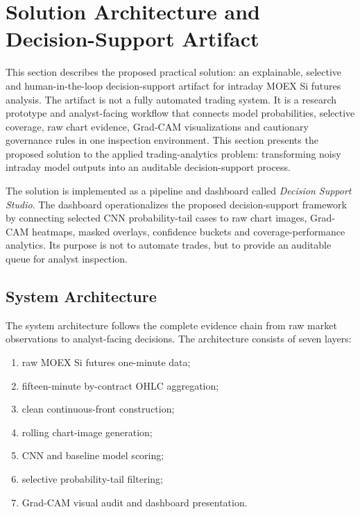 
\section{Solution Architecture and Decision-Support Artifact}
\label{sec:solution_architecture}

This section describes the proposed practical solution: an explainable, selective and human-in-the-loop decision-support artifact for intraday MOEX Si futures analysis. The artifact is not a fully automated trading system. It is a research prototype and analyst-facing workflow that connects model probabilities, selective coverage, raw chart evidence, Grad-CAM visualizations and cautionary governance rules in one inspection environment. This section presents the proposed solution to the applied trading-analytics problem: transforming noisy intraday model outputs into an auditable decision-support process.

The solution is implemented as a pipeline and dashboard called \emph{Decision Support Studio}. The dashboard operationalizes the proposed decision-support framework by connecting selected CNN probability-tail cases to raw chart images, Grad-CAM heatmaps, masked overlays, confidence buckets and coverage-performance analytics. Its purpose is not to automate trades, but to provide an auditable queue for analyst inspection.

\subsection{System Architecture}
\label{subsec:system_architecture}

The system architecture follows the complete evidence chain from raw market observations to analyst-facing decisions. The architecture consists of seven layers:

\begin{enumerate}
    \item raw MOEX Si futures one-minute data;
    \item fifteen-minute by-contract OHLC aggregation;
    \item clean continuous-front construction;
    \item rolling chart-image generation;
    \item CNN and baseline model scoring;
    \item selective probability-tail filtering;
    \item Grad-CAM visual audit and dashboard presentation.
\end{enumerate}

